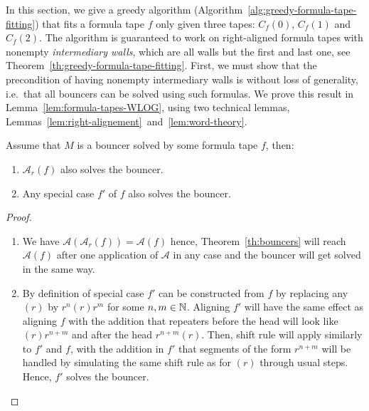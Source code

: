 In this section, we give a greedy algorithm (Algorithm~\ref{alg:greedy-formula-tape-fitting}) that fits a formula tape $f$ only given three tapes: $C_f(0)$, $C_f(1)$ and $C_f(2)$. The algorithm is guaranteed to work on right-aligned formula tapes with nonempty \textit{intermediary walls}, which are all walls but the first and last one, see Theorem~\ref{th:greedy-formula-tape-fitting}. First, we must show that the precondition of having nonempty intermediary walls is without loss of generality, i.e.\ that all bouncers can be solved using such formulas. We prove this result in Lemma~\ref{lem:formula-tapes-WLOG}, using two technical lemmas, Lemmas~\ref{lem:right-alignement}~and~\ref{lem:word-theory}.



\begin{lemma}\label{lem:right-alignement}
    Assume that $M$ is a bouncer solved by some formula tape $f$, then:
    \begin{enumerate}
        \item $\mathcal{A}_r(f)$ also solves the bouncer.
        \item Any special case $f'$ of $f$ also solves the bouncer.

    \end{enumerate}
\end{lemma}
\begin{proof}

    \begin{enumerate}
        \item We have $\mathcal{A}(\mathcal{A}_r(f)) = \mathcal{A}(f)$ hence, Theorem~\ref{th:bouncers} will reach $\mathcal{A}(f)$ after one application of $\mathcal{A}$ in any case and the bouncer will get solved in the same way.
        \item By definition of special case $f'$ can be constructed from $f$ by replacing any $(r)$ by $r^n(r)r^m$ for some $n,m\in\mathbb{N}$. Aligning $f'$ will have the same effect as aligning $f$ with the addition that repeaters before the head will look like $(r)r^{n+m}$  and after the head $r^{n+m}(r)$. Then, shift rule will apply similarly to $f'$ and $f$, with the addition in $f'$ that segments of the form $r^{n+m}$ will be handled by simulating the same shift rule as for $(r)$ through usual steps. Hence, $f'$ solves the bouncer.
    \end{enumerate}

\end{proof}

